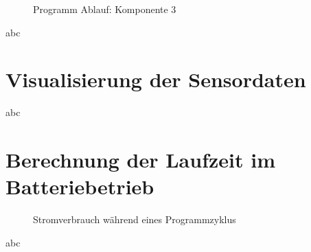 \begin{center}
	\begin{figure}[h]
	 
	 \noindent{}
	 \caption[PAP komponente 3]{Programm Ablauf: Komponente 3}
	 \label{fig:MQTTpubsub}
	\end{figure}
\end{center}

abc

\newpage

\section{Visualisierung der Sensordaten} \label{Dashboard und Visualisierung}

abc

\newpage


\section{Berechnung der Laufzeit im Batteriebetrieb} \label{Simulation}

\begin{center}
	\begin{figure}[h]
	 
	 \noindent{}
	 \caption[Stromverbrauch während eines Programmzyklus]{Stromverbrauch während eines Programmzyklus}
	 \label{fig:stromzyklus}
	\end{figure}
\end{center}

abc

\newpage

